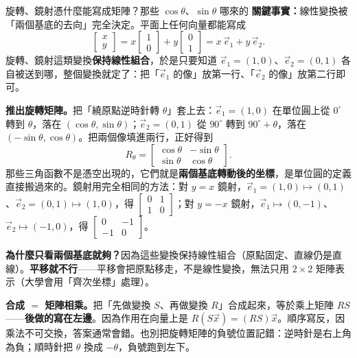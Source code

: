 \documentclass[11pt]{article}
\begin{document}
\begin{延伸框}{旋轉、鏡射憑什麼能寫成矩陣？那些 $\cos\theta$、$\sin\theta$ 哪來的}
\textbf{關鍵事實：}線性變換被「兩個基底的去向」完全決定。平面上任何向量都能寫成
$$\begin{bmatrix} x\\ y \end{bmatrix}=x\begin{bmatrix} 1\\ 0 \end{bmatrix}+y\begin{bmatrix} 0\\ 1 \end{bmatrix}=x\,\vec e_1+y\,\vec e_2.$$
旋轉、鏡射這類變換\textbf{保持線性組合}，於是只要知道 $\vec e_1=(1,0)$、$\vec e_2=(0,1)$ 各自被送到哪，整個變換就定了：把「$\vec e_1$ 的像」放第一行、「$\vec e_2$ 的像」放第二行即可。

\textbf{推出旋轉矩陣。}把「繞原點逆時針轉 $\theta$」套上去：$\vec e_1=(1,0)$ 在單位圓上從 $0^\circ$ 轉到 $\theta$，落在 $(\cos\theta,\sin\theta)$；$\vec e_2=(0,1)$ 從 $90^\circ$ 轉到 $90^\circ+\theta$，落在 $(-\sin\theta,\cos\theta)$。把兩個像填進兩行，正好得到
$$R_\theta=\begin{bmatrix} \cos\theta & -\sin\theta\\ \sin\theta & \cos\theta \end{bmatrix}.$$
那些三角函數不是憑空出現的，它們就是\textbf{兩個基底轉動後的坐標}，是單位圓的定義直接搬過來的。鏡射用完全相同的方法：對 $y=x$ 鏡射，$\vec e_1=(1,0)\mapsto(0,1)$、$\vec e_2=(0,1)\mapsto(1,0)$，得 $\begin{bmatrix} 0 & 1\\ 1 & 0 \end{bmatrix}$；對 $y=-x$ 鏡射，$\vec e_1\mapsto(0,-1)$、$\vec e_2\mapsto(-1,0)$，得 $\begin{bmatrix} 0 & -1\\ -1 & 0 \end{bmatrix}$。

\textbf{為什麼只看兩個基底就夠？}因為這些變換保持線性組合（原點固定、直線仍是直線）。\textbf{平移就不行}——平移會把原點移走，不是線性變換，無法只用 $2\times2$ 矩陣表示（大學會用「齊次坐標」處理）。
\end{延伸框}

\textbf{合成 $=$ 矩陣相乘。}把「先做變換 $S$、再做變換 $R$」合成起來，等於乘上矩陣 $RS$——\textbf{後做的寫在左邊}。因為作用在向量上是 $R(S\vec x)=(RS)\vec x$。順序寫反，因乘法不可交換，答案通常會錯。也別把旋轉矩陣的負號位置記錯：逆時針是右上角為負；順時針把 $\theta$ 換成 $-\theta$，負號跑到左下。
\end{document}
